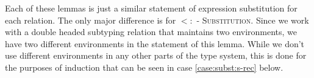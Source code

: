 \documentclass{llncs}
\numberwithin{subsubcase}{subcase}
\numberwithin{subcase}{casethm}
\numberwithin{casethm}{theorem}
\numberwithin{casethm}{lemma}
\begin{document}
Each of these lemmas is just a similar statement of expression 
substitution for each relation. The only major difference is 
for \textsc{$<:$ - Substitution}. Since we work with a double 
headed subtyping relation that maintains two environments, 
we have two different environments in the statement of this
lemma. While we don't use different environments in any other 
parts of the type system, this is done for the purposes of 
induction that can be seen in case \ref{case:subst:s-rec} below.
\end{document}
